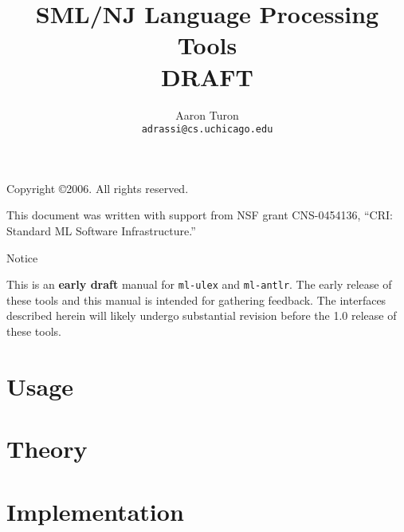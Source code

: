 \documentclass[11pt]{book}
\title{SML/NJ Language Processing Tools\\
DRAFT}
\author{Aaron Turon\\
\texttt{adrassi@cs.uchicago.edu}}
\newcommand{\parttext}{}
\newcommand{\cpart}[1]{\renewcommand{\parttext}{#1}\part{#1}}
\begin{document}
\frontmatter

	\maketitle
	
	\phantom{.}
	
	\noindent Copyright \copyright{}2006.  All rights reserved.
	
	\vskip 12pt
	\noindent This document was written with support from NSF grant CNS-0454136, ``CRI: Standard ML Software Infrastructure.''
	
	\pagebreak
	
	\tableofcontents

\mainmatter

	\renewcommand{\chaptermark}[1]{\markboth{#1}{}}
	\renewcommand{\sectionmark}[1]{\markright{\thesection. \ #1}{}}

    \newpage
    \phantom{.}
	\vskip 72pt
	\begin{center}
	{\Huge Notice}
	\end{center}
	\vskip 20pt \noindent
	{\Large This is an \textbf{early draft} manual for {\tt ml-ulex} and {\tt ml-antlr}.  The early release of these tools and this manual is intended for gathering feedback.  The interfaces described herein will likely undergo substantial revision before the 1.0 release of these tools.}
	
	\newpage

	
	
	\renewcommand{\chaptermark}[1]{\markboth{\parttext{}: #1}{}}

	\cpart{Usage}
	
		
		
	
	\cpart{Theory}
	
		
		

	\cpart{Implementation}

		
		

\backmatter

	
	
\end{document}

